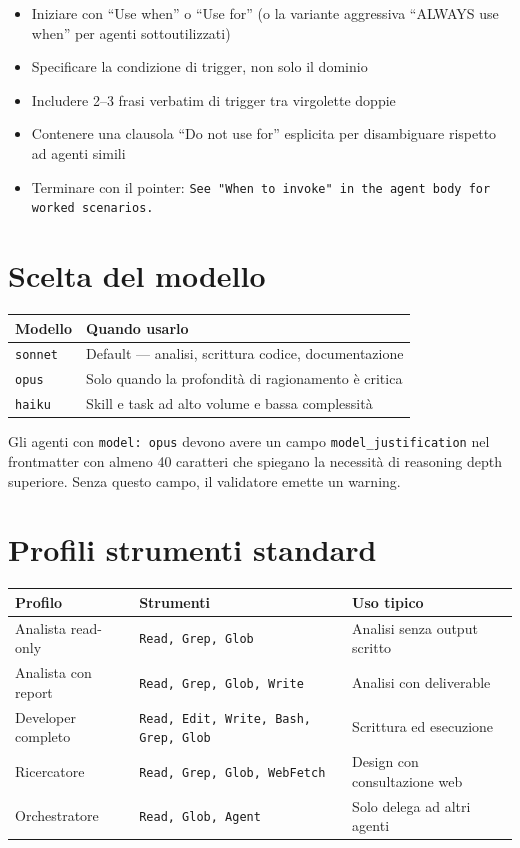 \documentclass[12pt,a4paper,twoside]{book}
\begin{document}
\begin{itemize}
  \item Iniziare con ``Use when'' o ``Use for'' (o la variante aggressiva ``ALWAYS use when'' per agenti sottoutilizzati)
  \item Specificare la condizione di trigger, non solo il dominio
  \item Includere 2--3 frasi verbatim di trigger tra virgolette doppie
  \item Contenere una clausola ``Do not use for'' esplicita per disambiguare rispetto ad agenti simili
  \item Terminare con il pointer: \texttt{See "When to invoke" in the agent body for worked scenarios.}
\end{itemize}

\section{Scelta del modello}

\begin{center}
\begin{tabular}{ll}
\toprule
\textbf{Modello} & \textbf{Quando usarlo} \\
\midrule
\texttt{sonnet} & Default — analisi, scrittura codice, documentazione \\
\texttt{opus} & Solo quando la profondità di ragionamento è critica \\
\texttt{haiku} & Skill e task ad alto volume e bassa complessità \\
\bottomrule
\end{tabular}
\end{center}

Gli agenti con \texttt{model: opus} devono avere un campo \texttt{model\_justification} nel frontmatter con almeno 40 caratteri che spiegano la necessità di reasoning depth superiore. Senza questo campo, il validatore emette un warning.

\section{Profili strumenti standard}

\begin{center}
\begin{tabular}{lll}
\toprule
\textbf{Profilo} & \textbf{Strumenti} & \textbf{Uso tipico} \\
\midrule
Analista read-only & \texttt{Read, Grep, Glob} & Analisi senza output scritto \\
Analista con report & \texttt{Read, Grep, Glob, Write} & Analisi con deliverable \\
Developer completo & \texttt{Read, Edit, Write, Bash, Grep, Glob} & Scrittura ed esecuzione \\
Ricercatore & \texttt{Read, Grep, Glob, WebFetch} & Design con consultazione web \\
Orchestratore & \texttt{Read, Glob, Agent} & Solo delega ad altri agenti \\
\bottomrule
\end{tabular}
\end{center}
\end{document}
